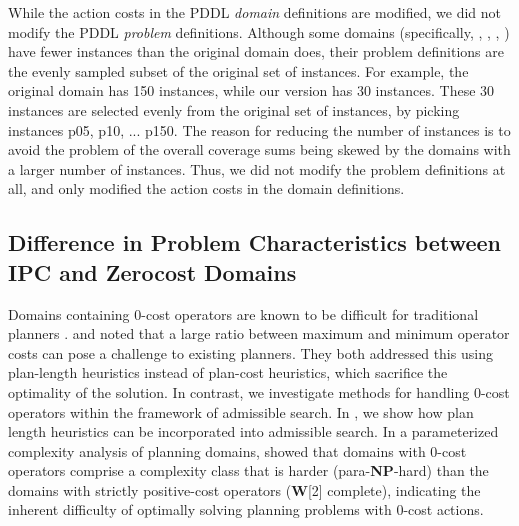 While the action costs in the PDDL \emph{domain} definitions are modified,
we did not modify the PDDL \emph{problem} definitions.
Although some domains (specifically, , , ,
) have fewer instances than the original domain does,
their problem definitions are the evenly sampled subset of the original set of instances.
For example, the original  domain has 150 instances, while our version has 30 instances.
These 30 instances are selected evenly from the original set of instances, by picking instances p05, p10, ... p150.
% 
The reason for reducing the number of instances is to avoid the problem of the overall coverage sums being skewed by the domains with a larger number of instances.
Thus, we did not modify the problem definitions at all, and only modified the action costs in the domain definitions.

\subsection{Difference in Problem Characteristics between IPC and Zerocost Domains}

Domains containing 0-cost operators are known to be difficult for traditional planners \cite{thayer2009using,cushing2010cost,wilt2011cost,thayer2011bounded,richter2011lama}.
\citeauthor{cushing2010cost} \citeyear{cushing2010cost} and \citeauthor{wilt2011cost} \citeyear{wilt2011cost} noted that a large ratio between maximum and minimum operator costs can pose a challenge to existing planners. They both addressed this using plan-length heuristics instead of plan-cost heuristics, which sacrifice the optimality of the solution. In contrast, we investigate methods for handling 0-cost operators within the framework of admissible search. In , we show how  plan length heuristics can be incorporated into admissible search.
In a parameterized complexity analysis of planning domains,
\citeauthor{aghighi2015} \citeyear{aghighi2015,aghighi2016} %
showed %
that domains with 0-cost operators comprise a complexity class that is harder (para-\textbf{NP}-hard) than the domains with strictly positive-cost operators (\textbf{W}[2] complete), 
indicating the inherent difficulty of optimally solving planning problems with 0-cost actions.

